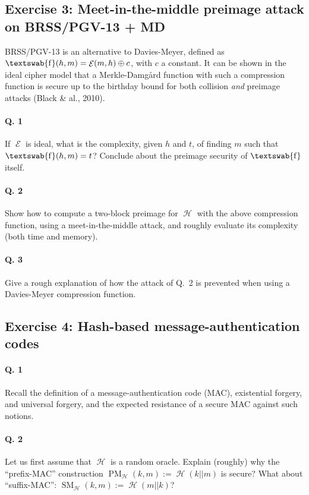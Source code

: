 \documentclass[11pt,a4paper]{article}
\DeclareMathOperator\hash{\mathcal{H}}
\DeclareMathOperator\E{\mathcal{E}}
\DeclareMathOperator\comp{\textswab{f}}
\DeclareMathOperator\pmm{\mathrm{PM}}
\DeclareMathOperator\smm{\mathrm{SM}}
\begin{document}
\subsection*{Exercise 3: Meet-in-the-middle preimage attack on BRSS/PGV-13 + MD}
BRSS/PGV-13 is an alternative to Davies-Meyer, defined as $\comp(h,m) = \E(m,h) \oplus c$, with $c$ a constant. It can be shown in the ideal cipher model that
a Merkle-Damg\aa rd function with such a compression function is secure up to the birthday bound for both collision \emph{and} preimage attacks (Black \& al., 2010).

\paragraph{Q. 1} If $\E$ is ideal, what is the complexity, given $h$ and $t$, of finding $m$ such that $\comp(h, m) = t$? Conclude about the preimage security
of $\comp$ itself.

\paragraph{Q. 2} Show how to compute a two-block preimage for $\hash$ with the above compression function, using a
meet-in-the-middle attack, and roughly evaluate its complexity (both time and memory).

\paragraph{Q. 3} Give a rough explanation of how the attack of Q.~2 is prevented when using a Davies-Meyer compression function.

\subsection*{Exercise 4: Hash-based message-authentication codes}

\paragraph{Q. 1} Recall the definition of a message-authentication code (MAC), existential forgery, and universal forgery,
and the expected resistance of a secure MAC against such notions.

\paragraph{Q. 2} Let us first assume that $\hash$ is a random oracle. Explain (roughly) why the ``prefix-MAC'' construction
$\pmm_{\hash}(k, m) := \hash(k||m)$ is secure? What about ``suffix-MAC'': $\smm_{\hash}(k, m) := \hash(m||k)$?
\end{document}
